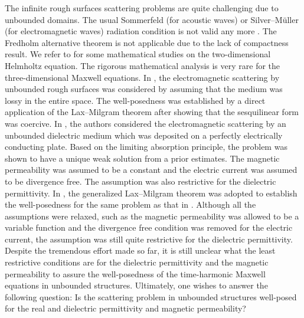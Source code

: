 \documentclass[11pt,reqno]{amsart}
\numberwithin{equation}{section}
\begin{document}
The infinite rough surfaces scattering problems are quite challenging due to
unbounded domains. The usual Sommerfeld (for acoustic waves) or
Silver--M\"{u}ller (for electromagnetic waves) radiation condition is not valid
any more \cite{Zhang1998accoustic, Arens2005radiation}. The Fredholm alternative
theorem is not applicable due to the lack of compactness result. We refer to
\cite{Chandler2006acoustic, Chandler2005existence, Chandler1999scattering,
Li2012analysis, Lechleiter2010variational} for some
mathematical studies on the two-dimensional Helmholtz equation. The rigorous
mathematical analysis is very rare for the three-dimensional Maxwell equations.
In \cite{Li2011electromagnetic}, the electromagnetic scattering by unbounded
rough surfaces was considered by assuming that the medium was lossy in
the entire space. The well-posedness was established by a direct application of
the Lax--Milgram theorem after showing that the sesquilinear form was coercive.
In \cite{Haddar2011electromagnetice}, the authors considered the
electromagnetic scattering by an unbounded dielectric medium which was
deposited on a perfectly electrically conducting plate. Based on the limiting
absorption principle, the problem was shown to have a unique weak solution from
a prior estimates. The magnetic permeability was assumed to be a constant and
the electric current was assumed to be divergence free. The assumption was also 
restrictive for the dielectric permittivity. In \cite{LiZhengZhengMMAS}, the
generalized Lax--Milgram theorem was adopted to establish the well-posedness
for the same problem as that in \cite{Haddar2011electromagnetice}. Although
all the assumptions were relaxed, such as the magnetic permeability was allowed
to be a variable function and the divergence free condition was removed for the
electric current, the assumption was still quite restrictive for the dielectric
permittivity. Despite the tremendous effort made so far, it is still unclear
what the least restrictive conditions are for the dielectric permittivity and
the magnetic permeability to assure the well-posedness of the time-harmonic
Maxwell equations in unbounded structures. Ultimately, one wishes to answer the
following question: Is the scattering problem in unbounded structures well-posed
for the real and dielectric permittivity and magnetic permeability?
\end{document}
